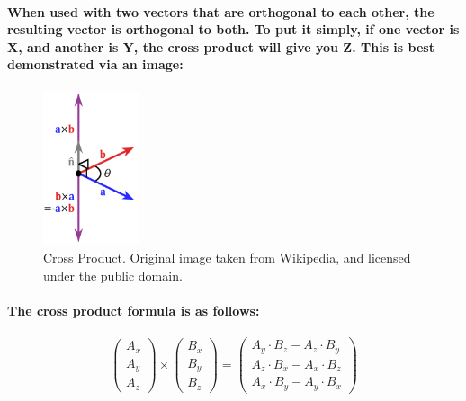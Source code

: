\paragraph{
    When used with two vectors that are orthogonal to each other, the resulting vector is orthogonal to both.
    To put it simply, if one vector is X, and another is Y, the cross product will give you Z. This is best demonstrated via an image:
}

\begin{frame}{}
    \begin{figure}[ht]
      \centering
      \includegraphics[width=0.25\textwidth]{images/chap2/CrossProduct.png}
      \caption{Cross Product. Original image taken from Wikipedia, and licensed under the public domain.}
      \label{fig:cross_product}
    \end{figure}
\end{frame}
\newpage
\paragraph{
    The cross product formula is as follows:
}

\paragraph{
    \begin{equation}
    \begin{pmatrix}
    A_{x}\\
    A_{y}\\
    A_{z}
    \end{pmatrix} \times \begin{pmatrix}
    B_{x}\\
    B_{y}\\
    B_{z}
    \end{pmatrix} =\begin{pmatrix}
    A_{y} \cdot B_{z} -A_{z} \cdot B_{y}\\
    A_{z} \cdot B_{x} -A_{x} \cdot B_{z}\\
    A_{x} \cdot B_{y} -A_{y} \cdot B_{x}
    \end{pmatrix}
    \end{equation}
}

